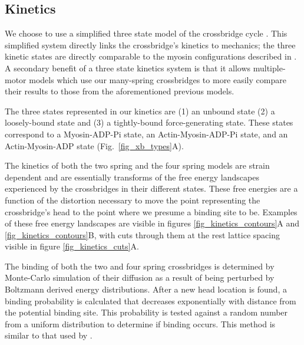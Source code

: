 \documentclass[]{article}
\begin{document}
\subsection*{Kinetics} %
We choose to use a simplified three state model of the crossbridge cycle \citep{Pate1989, Tanner2007}. 
This simplified system directly links the crossbridge's kinetics to mechanics; the three kinetic states are directly comparable to the myosin configurations described in \citet{Houdusse2000}.
A secondary benefit of a three state kinetics system is that it allows multiple-motor models which use our many-spring crossbridges to more easily compare their results to those from the aforementioned previous models.

The three states represented in our kinetics are (1) an unbound state (2) a loosely-bound state and (3) a tightly-bound force-generating state.
These states correspond to a Myosin-ADP-Pi state, an Actin-Myosin-ADP-Pi state, and an Actin-Myosin-ADP state (Fig.~\ref{fig_xb_types}A).

The kinetics of both the two spring and the four spring models are strain dependent and are essentially transforms of the free energy landscapes experienced by the crossbridges in their different states.
These free energies are a function of the distortion necessary to move the point representing the crossbridge's head to the point where we presume a binding site to be.
Examples of these free energy landscapes are visible in figures \ref{fig_kinetics_contours}A and \ref{fig_kinetics_contours}B, with cuts through them at the rest lattice spacing visible in figure \ref{fig_kinetics_cuts}A.

The binding of both the two and four spring crossbridges is determined by Monte-Carlo simulation of their diffusion as a result of being perturbed by Boltzmann derived energy distributions. 
After a new head location is found, a binding probability is calculated that decreases exponentially with distance from the potential binding site. 
This probability is tested against a random number from a uniform distribution to determine if binding occurs.
This method is similar to that used by \citet{Tanner2007}. 
\end{document}
